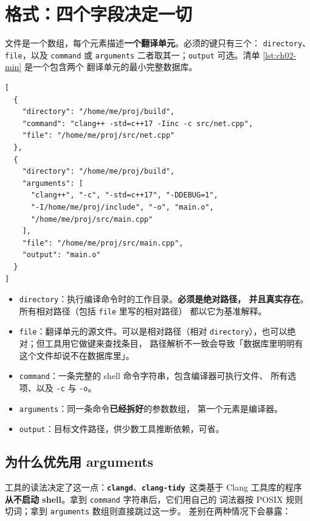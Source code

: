 \documentclass[12pt,a4paper,fontset=fandol]{ctexbook}
\newcommand{\Lib}[1]{\textbf{\texttt{#1}}}
\newcommand{\Tidy}{\Lib{clang-tidy}}
\newcommand{\CD}{\Lib{clangd}}
\begin{document}
\section{格式：四个字段决定一切}
\label{sec:ch02-s1}

文件是一个数组，每个元素描述\textbf{一个翻译单元}。必须的键只有三个：
\texttt{directory}、\texttt{file}，以及 \texttt{command} 或 \texttt{arguments}
二者取其一；\texttt{output} 可选。清单 \ref{lst:ch02-min} 是一个包含两个
翻译单元的最小完整数据库。

\begin{lstlisting}[style=jsonstyle,caption={最小完整数据库：两个翻译单元，分别用 command 与 arguments},label={lst:ch02-min}]
[
  {
    "directory": "/home/me/proj/build",
    "command": "clang++ -std=c++17 -Iinc -c src/net.cpp",
    "file": "/home/me/proj/src/net.cpp"
  },
  {
    "directory": "/home/me/proj/build",
    "arguments": [
      "clang++", "-c", "-std=c++17", "-DDEBUG=1",
      "-I/home/me/proj/include", "-o", "main.o",
      "/home/me/proj/src/main.cpp"
    ],
    "file": "/home/me/proj/src/main.cpp",
    "output": "main.o"
  }
]
\end{lstlisting}

\begin{itemize}
  \item \texttt{directory}：执行编译命令时的工作目录。\textbf{必须是绝对路径，
        并且真实存在}。所有相对路径（包括 \texttt{file} 里写的相对路径）
        都以它为基准解释。
  \item \texttt{file}：翻译单元的源文件。可以是相对路径（相对
        \texttt{directory}），也可以绝对；但工具用它做键来查找条目，
        路径解析不一致会导致「数据库里明明有这个文件却说不在数据库里」。
  \item \texttt{command}：一条完整的 shell 命令字符串，包含编译器可执行文件、
        所有选项、以及 \texttt{-c} 与 \texttt{-o}。
  \item \texttt{arguments}：同一条命令\textbf{已经拆好}的参数数组，
        第一个元素是编译器。
  \item \texttt{output}：目标文件路径，供少数工具推断依赖，可省。
\end{itemize}

\subsection*{为什么优先用 arguments}

工具的读法决定了这一点：\CD、\Tidy\ 这类基于 Clang 工具库的程序
\textbf{从不启动 shell}。拿到 \texttt{command} 字符串后，它们用自己的
词法器按 POSIX 规则切词；拿到 \texttt{arguments} 数组则直接跳过这一步。
差别在两种情况下会暴露：
\end{document}
